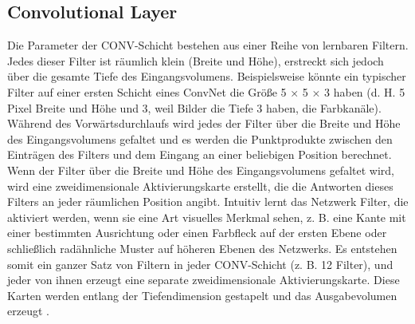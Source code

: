 
  \subsection{Convolutional Layer}

  Die Parameter der CONV-Schicht bestehen aus einer Reihe von lernbaren Filtern. Jedes dieser Filter ist räumlich klein (Breite und Höhe), erstreckt sich jedoch über die gesamte Tiefe des Eingangsvolumens. Beispielsweise könnte ein typischer Filter auf einer ersten Schicht eines ConvNet die Größe 5 × 5 × 3 haben (d. H. 5 Pixel Breite und Höhe und 3, weil Bilder die Tiefe 3 haben, die Farbkanäle). Während des Vorwärtsdurchlaufs wird jedes der Filter über die Breite und Höhe des Eingangsvolumens gefaltet und es werden die Punktprodukte zwischen den Einträgen des Filters und dem Eingang an einer beliebigen Position berechnet. Wenn der Filter über die Breite und Höhe des Eingangsvolumens gefaltet wird, wird eine zweidimensionale Aktivierungskarte erstellt, die die Antworten dieses Filters an jeder räumlichen Position angibt. Intuitiv lernt das Netzwerk Filter, die aktiviert werden, wenn sie eine Art visuelles Merkmal sehen, z. B. eine Kante mit einer bestimmten Ausrichtung oder einen Farbfleck auf der ersten Ebene oder schließlich radähnliche Muster auf höheren Ebenen des Netzwerks. Es entstehen somit ein ganzer Satz von Filtern in jeder CONV-Schicht (z. B. 12 Filter), und jeder von ihnen erzeugt eine separate zweidimensionale Aktivierungskarte. Diese Karten werden entlang der Tiefendimension gestapelt und das Ausgabevolumen erzeugt \cite*{StanfordUniversityCoursecs231n2018a}.

